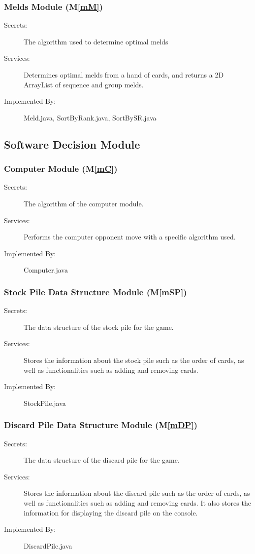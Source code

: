 \documentclass[12pt, titlepage]{article}
\newcommand{\mref}[1]{M\ref{#1}}
\begin{document}
\subsubsection{Melds Module (\mref{mM})}
\begin{description}
    \item[Secrets:]The algorithm used to determine optimal melds
    \item[Services:]Determines optimal melds from a hand of cards, and returns a 2D ArrayList of sequence and group melds. 
    \item[Implemented By:]Meld.java, SortByRank.java, SortBySR.java
\end{description}
\subsection{Software Decision Module}

\subsubsection{Computer Module (\mref{mC})}
\begin{description}
    \item[Secrets:]The algorithm of the computer module.
    \item[Services:]Performs the computer opponent move with a specific algorithm used.
    \item[Implemented By:] Computer.java
\end{description}

\subsubsection{Stock Pile Data Structure Module (\mref{mSP})}
\begin{description}
    \item[Secrets:]The data structure of the stock pile for the game.
    \item[Services:]Stores the information about the stock pile such as the order of cards, as well as functionalities such as adding and removing cards. 
    \item[Implemented By:]StockPile.java
\end{description}

\subsubsection{Discard Pile Data Structure Module (\mref{mDP})}
\begin{description}
    \item[Secrets:]The data structure of the discard pile for the game.
    \item[Services:]Stores the information about the discard pile such as the order of cards, as well as functionalities such as adding and removing cards. It also stores the information for displaying the discard pile on the console. 
    \item[Implemented By:] DiscardPile.java
\end{description}
\end{document}

